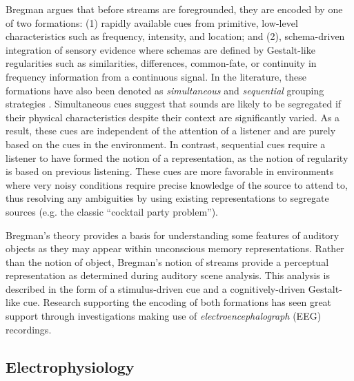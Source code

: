 Bregman argues that before streams are foregrounded, they are encoded by one of two formations: (1) rapidly available cues from primitive, low-level characteristics such as frequency, intensity, and location; and (2), schema-driven integration of sensory evidence where schemas are defined by Gestalt-like regularities such as similarities, differences, common-fate, or continuity in frequency information from a continuous signal.  In the literature, these formations have also been denoted as \textit{simultaneous} and \textit{sequential} grouping strategies \cite{Winkler2009a}.  Simultaneous cues suggest that sounds are likely to be segregated if their physical characteristics despite their context are significantly varied.  As a result, these cues are independent of the attention of a listener and are purely based on the cues in the environment.  In contrast, sequential cues require a listener to have formed the notion of a representation, as the notion of regularity is based on previous listening.  These cues are more favorable in environments where very noisy conditions require precise knowledge of the source to attend to, thus resolving any ambiguities by using existing representations to segregate sources (e.g. the classic ``cocktail party problem'').  

Bregman's theory provides a basis for understanding some features of auditory objects as they may appear within unconscious memory representations.  Rather than the notion of object, Bregman's notion of streams provide a perceptual representation as determined during auditory scene analysis.  This analysis is described in the form of a stimulus-driven cue and a cognitively-driven Gestalt-like cue.  Research supporting the encoding of both formations has seen great support through investigations making use of \textit{electroencephalograph} (EEG) recordings.  

\subsection{Electrophysiology}

